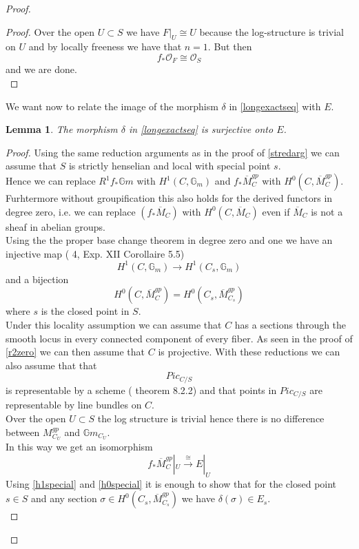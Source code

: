 \documentclass{amsart}
\newtheorem{lm}[thm]{Lemma}
\theoremstyle{definition}
\numberwithin{equation}{section}
\begin{document}
\begin{proof}
\begin{proof}
Over the open $U\subset S$ we have $F|_U\cong U$ because the log-structure is trivial on $U$ and by locally freeness we have that $n=1$. But then
$$
f_{*}{\mathcal{O}}_F\cong {\mathcal{O}}_S
$$
\noindent and we are done.\\
\end{proof}
We want now to relate the image of the morphism $\delta$ in \ref{longexactseq} with $E$.
\begin{lm}\label{imagedelta}
\noindent The morphism $\delta$ in \ref{longexactseq} is surjective onto $E$. \\
\end{lm}
\begin{proof}
    Using the same reduction arguments as in the proof of \ref{stredarg} we can assume that $S$ is strictly henselian and local with special point $s$.\\
Hence we can replace $ R^1f_{*}\mathbb{G}m$ with $H^1(C,\mathbb{G}_m)$ and $f_{*}\overline{M}_C^{gp}$ with $ H^0(C,\overline{M}_{C}^{gp})$. \\
Furhtermore without groupification this also holds for the derived functors in degree zero, i.e. we can replace $(f_{*}\overline{M}_C)$ with $H^0(C,\overline{M}_{C})$ even if $\overline{M}_C$ is not a sheaf in abelian groups.\\
Using the the proper base change theorem in degree zero and one we have an injective map (\cite{sga} 4, Exp. XII Corollaire 5.5)
\begin{equation}\label{h1special}
H^1(C,\mathbb{G}_m){\rightarrow} H^1(C_{s},\mathbb{G}_m)
\end{equation}
\noindent and a bijection
\begin{equation}\label{h0special}
H^0(C,\overline{M}_{C}^{gp})= H^0(C_{s},\overline{M}_{C_{s}}^{gp})
\end{equation}
\noindent where $s$ is the closed point in $S$. \\
Under this locality assumption we can assume that $C$ has a sections through the smooth locus in every connected component of every fiber.
As seen in the proof of \ref{r2zero} we can then assume that $C$ is projective. With these reductions we can also assume that that 
$$
Pic_{C/S}
$$
\noindent is representable by a scheme (\cite{blr} theorem 8.2.2) and that points in $Pic_{C/S}$ are representable by line bundles on $C$.\\
Over the open $U\subset S$ the log structure is trivial hence there is no difference between $M_{C_U}^{gp}$ and ${\mathbb{G}m}_{C_U}$. \\
In this way we get an isomorphism
 $$
 f_{*}\overline{M}_{C}^{gp}|_U\stackrel{\cong}{\rightarrow} E|_U
 $$
\noindent Using \ref{h1special} and \ref{h0special} it is enough to show that for the closed point $s\in S$ and any section $\sigma\in H^0(C_s,\overline{M}_{C_s}^{gp})$ we have $\delta(\sigma)\in E_s$.\\


\end{proof}
\end{proof}
\end{document}
